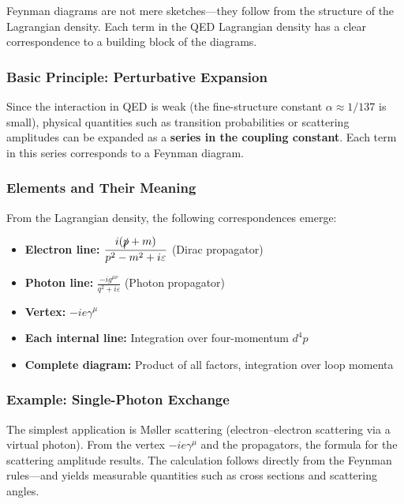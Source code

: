 Feynman diagrams are not mere sketches—they follow from the structure of the Lagrangian density. Each term in the QED Lagrangian density has a clear correspondence to a building block of the diagrams.

\subsubsection*{Basic Principle: Perturbative Expansion}
Since the interaction in QED is weak (the fine-structure constant $\alpha \approx 1/137$ is small), physical quantities such as transition probabilities or scattering amplitudes can be expanded as a \textbf{series in the coupling constant}. Each term in this series corresponds to a Feynman diagram.

\subsubsection*{Elements and Their Meaning}
From the Lagrangian density, the following correspondences emerge:

\vspace{0.5em}
\begin{tcolorbox}[mathebox, title=Feynman Rules of QED (Simplified)]
	\label{box:Feynman-Regeln der QED}
	\begin{itemize}
		\item \textbf{Electron line:} $\displaystyle \frac{i(\slashed{p} + m)}{p^2 - m^2 + i\varepsilon}$ (Dirac propagator)
		\item \textbf{Photon line:} $\displaystyle \frac{-ig^{\mu\nu}}{q^2 + i\varepsilon}$ (Photon propagator)
		\item \textbf{Vertex:} $-ie\gamma^\mu$
		\item \textbf{Each internal line:} Integration over four-momentum $d^4p$
		\item \textbf{Complete diagram:} Product of all factors, integration over loop momenta
	\end{itemize}
\end{tcolorbox}

\subsubsection*{Example: Single-Photon Exchange}
The simplest application is Møller scattering (electron–electron scattering via a virtual photon). From the vertex $-ie\gamma^\mu$ and the propagators, the formula for the scattering amplitude results. The calculation follows directly from the Feynman rules—and yields measurable quantities such as cross sections and scattering angles.

